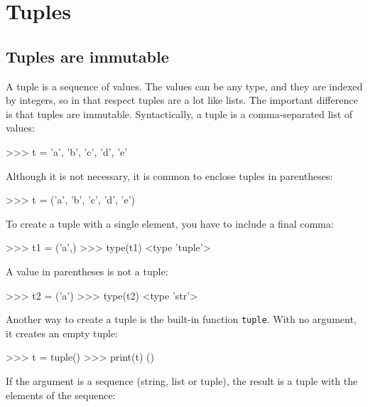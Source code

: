 \chapter{Tuples}
\label{tuplechap}

\section{Tuples are immutable}


A tuple is a sequence of values.  The values can be any type, and
they are indexed by integers, so in that respect tuples are a lot
like lists.  The important difference is that tuples are immutable.
%
%
Syntactically, a tuple is a comma-separated list of values:

\beforeverb
\begin{pycode}
>>> t = 'a', 'b', 'c', 'd', 'e'
\end{pycode}
\afterverb
%
Although it is not necessary, it is common to enclose tuples in
parentheses:


\beforeverb
\begin{pycode}
>>> t = ('a', 'b', 'c', 'd', 'e')
\end{pycode}
\afterverb
%
To create a tuple with a single element, you have to include a final
comma:


\beforeverb
\begin{pycode}
>>> t1 = ('a',)
>>> type(t1)
<type 'tuple'>
\end{pycode}
\afterverb
%
A value in parentheses is not a tuple:

\beforeverb
\begin{pycode}
>>> t2 = ('a')
>>> type(t2)
<type 'str'>
\end{pycode}
\afterverb
%
Another way to create a tuple is the built-in function {\tt tuple}.
With no argument, it creates an empty tuple:


\beforeverb
\begin{pycode}
>>> t = tuple()
>>> print(t)
()
\end{pycode}
\afterverb
%
If the argument is a sequence (string, list or tuple), the result
is a tuple with the elements of the sequence:

